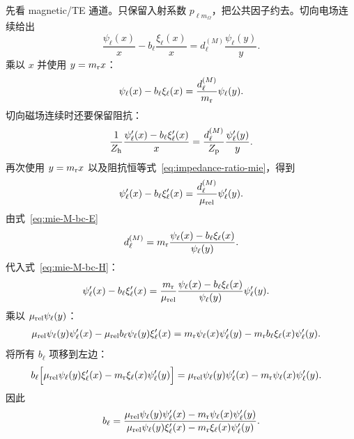 先看 magnetic/TE 通道。只保留入射系数
$p_{\ell m_{\Omega}}$，把公共因子约去。切向电场连续给出
\begin{equation}
\frac{\psi_\ell(x)}{x}
-b_\ell\frac{\xi_\ell(x)}{x}
=d_\ell^{(M)}\frac{\psi_\ell(y)}{y}.
\end{equation}
乘以 $x$ 并使用 $y=m_{\rm r}x$：
\begin{equation}
\psi_\ell(x)-b_\ell\xi_\ell(x)
=\frac{d_\ell^{(M)}}{m_{\rm r}}\psi_\ell(y).
\label{eq:mie-M-bc-E}
\end{equation}
切向磁场连续时还要保留阻抗：
\begin{equation}
\frac{1}{Z_{\rm h}}
\frac{\psi_\ell'(x)-b_\ell\xi_\ell'(x)}{x}
=
\frac{d_\ell^{(M)}}{Z_{\rm p}}
\frac{\psi_\ell'(y)}{y}.
\end{equation}
再次使用 $y=m_{\rm r}x$ 以及阻抗恒等式~\cref{eq:impedance-ratio-mie}，得到
\begin{equation}
\psi_\ell'(x)-b_\ell\xi_\ell'(x)
=\frac{d_\ell^{(M)}}{\mu_{\rm rel}}
\psi_\ell'(y).
\label{eq:mie-M-bc-H}
\end{equation}
由式~\cref{eq:mie-M-bc-E}
\begin{equation}
d_\ell^{(M)}
=m_{\rm r}
\frac{\psi_\ell(x)-b_\ell\xi_\ell(x)}
{\psi_\ell(y)}.
\end{equation}
代入式~\cref{eq:mie-M-bc-H}：
\begin{align}
\psi_\ell'(x)-b_\ell\xi_\ell'(x)
&=\frac{m_{\rm r}}{\mu_{\rm rel}}
\frac{\psi_\ell(x)-b_\ell\xi_\ell(x)}
{\psi_\ell(y)}\psi_\ell'(y).
\end{align}
乘以 $\mu_{\rm rel}\psi_\ell(y)$：
\begin{align}
\mu_{\rm rel}\psi_\ell(y)\psi_\ell'(x)
-\mu_{\rm rel}b_\ell\psi_\ell(y)\xi_\ell'(x)
={}&
 m_{\rm r}\psi_\ell(x)\psi_\ell'(y)
-m_{\rm r}b_\ell\xi_\ell(x)\psi_\ell'(y).
\end{align}
将所有 $b_\ell$ 项移到左边：
\begin{align}
b_\ell\Bigl[
\mu_{\rm rel}\psi_\ell(y)\xi_\ell'(x)
-m_{\rm r}\xi_\ell(x)\psi_\ell'(y)
\Bigr]
={}&
\mu_{\rm rel}\psi_\ell(y)\psi_\ell'(x)
-m_{\rm r}\psi_\ell(x)\psi_\ell'(y).
\end{align}
因此
\begin{equation}
{
b_\ell=
\frac{
\mu_{\rm rel}\psi_\ell(y)\psi_\ell'(x)
-m_{\rm r}\psi_\ell(x)\psi_\ell'(y)
}{
\mu_{\rm rel}\psi_\ell(y)\xi_\ell'(x)
-m_{\rm r}\xi_\ell(x)\psi_\ell'(y)
}.}
\label{eq:mie-b-standard}
\end{equation}

